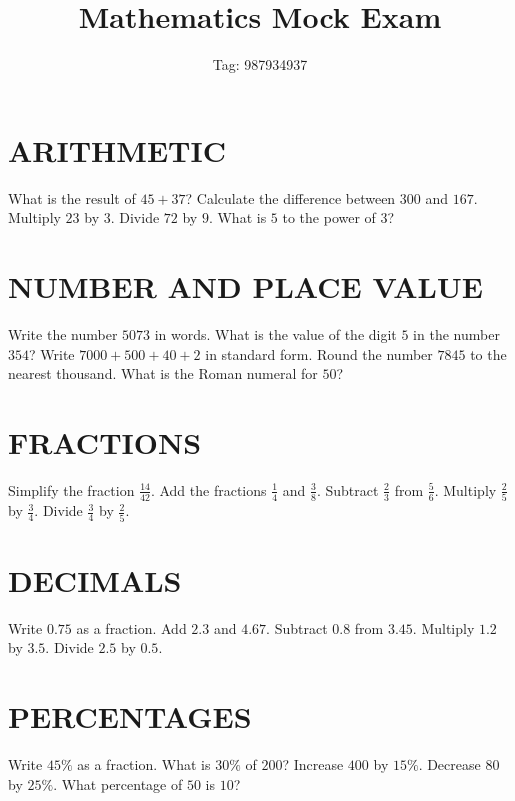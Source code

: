\documentclass{exam}
\begin{document}
\title{Mathematics Mock Exam}
\date{Tag: 987934937}
\maketitle

\section{ARITHMETIC}
\begin{questions}
\question What is the result of $45 + 37$?
\question Calculate the difference between $300$ and $167$.
\question Multiply $23$ by $3$.
\question Divide $72$ by $9$.
\question What is $5$ to the power of $3$?
\end{questions}

\section{NUMBER AND PLACE VALUE}
\begin{questions}
\question Write the number $5073$ in words.
\question What is the value of the digit $5$ in the number $354$?
\question Write $7000 + 500 + 40 + 2$ in standard form.
\question Round the number $7845$ to the nearest thousand.
\question What is the Roman numeral for $50$?
\end{questions}

\section{FRACTIONS}
\begin{questions}
\question Simplify the fraction $\frac{14}{42}$.
\question Add the fractions $\frac{1}{4}$ and $\frac{3}{8}$.
\question Subtract $\frac{2}{3}$ from $\frac{5}{6}$.
\question Multiply $\frac{2}{5}$ by $\frac{3}{4}$.
\question Divide $\frac{3}{4}$ by $\frac{2}{5}$.
\end{questions}

\section{DECIMALS}
\begin{questions}
\question Write $0.75$ as a fraction.
\question Add $2.3$ and $4.67$.
\question Subtract $0.8$ from $3.45$.
\question Multiply $1.2$ by $3.5$.
\question Divide $2.5$ by $0.5$.
\end{questions}

\section{PERCENTAGES}
\begin{questions}
\question Write $45\%$ as a fraction.
\question What is $30\%$ of $200$?
\question Increase $400$ by $15\%$.
\question Decrease $80$ by $25\%$.
\question What percentage of $50$ is $10$?
\end{questions}
\end{document}

